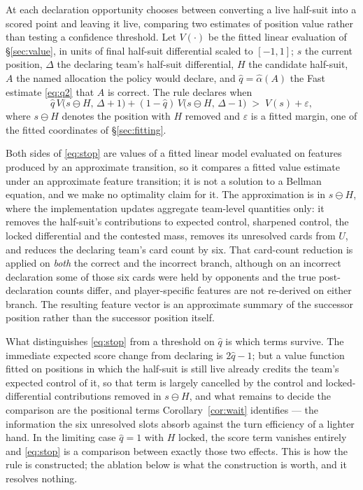 At each declaration opportunity \vfast{} chooses between converting a live
half-suit into a scored point and leaving it live, comparing two estimates of
position value rather than testing a confidence threshold. Let $V(\cdot)$ be the
fitted linear evaluation of \S\ref{sec:value}, in units of final half-suit
differential scaled to $[-1,1]$; $s$ the current position, $\Delta$ the declaring
team's half-suit differential, $H$ the candidate half-suit, $A$ the named
allocation the policy would declare, and $\hat q = \hat\alpha(A)$ the Fast
estimate \eqref{eq:q2} that $A$ is correct. The rule declares when
\begin{equation}
  \hat q\, V\bigl(s \ominus H,\, \Delta{+}1\bigr)
  + (1 - \hat q)\, V\bigl(s \ominus H,\, \Delta{-}1\bigr)
  \;>\; V(s) + \varepsilon,
  \label{eq:stop}
\end{equation}
where $s \ominus H$ denotes the position with $H$ removed and $\varepsilon$ is a
fitted margin, one of the \numParams{} fitted coordinates of \S\ref{sec:fitting}.

Both sides of \eqref{eq:stop} are values of a fitted linear model evaluated on
features produced by an approximate transition, so it compares a fitted value
estimate under an approximate feature transition; it is not a solution to a
Bellman equation, and we make no optimality claim for it. The approximation is in
$s \ominus H$, where the implementation updates aggregate team-level quantities
only: it removes the half-suit's contributions to expected control, sharpened
control, the locked differential and the contested mass, removes its unresolved
cards from $U$, and reduces the declaring team's card count by six. That
card-count reduction is applied on \emph{both} the correct and the incorrect
branch, although on an incorrect declaration some of those six cards were held by
opponents and the true post-declaration counts differ, and player-specific
features are not re-derived on either branch. The resulting feature vector is an
approximate summary of the successor position rather than the successor position
itself.

What distinguishes \eqref{eq:stop} from a threshold on $\hat q$ is which terms
survive. The immediate expected score change from declaring is $2\hat q - 1$; but
a value function fitted on positions in which the half-suit is still live already
credits the team's expected control of it, so that term is largely cancelled by
the control and locked-differential contributions removed in $s \ominus H$, and
what remains to decide the comparison are the positional terms
Corollary~\ref{cor:wait} identifies --- the information the six unresolved slots
absorb against the turn efficiency of a lighter hand. In the limiting case
$\hat q = 1$ with $H$ locked, the score term vanishes entirely and
\eqref{eq:stop} is a comparison between exactly those two effects. This is how
the rule is constructed; the ablation below is what the construction is worth,
and it resolves nothing.

